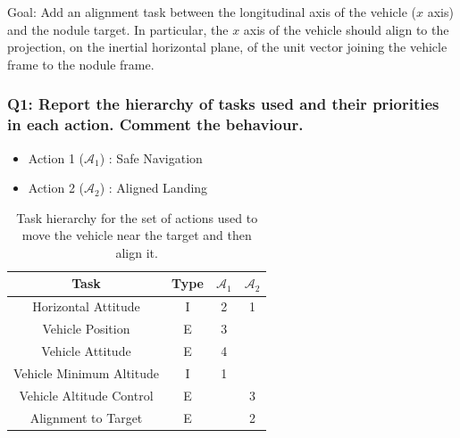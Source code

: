 \documentclass{article}
\begin{document}
Goal: Add an alignment task between the longitudinal axis of the vehicle ($x$ axis) and the nodule target. In particular, the $x$ axis of the vehicle should align to the projection, on the inertial horizontal plane, of the unit vector joining the vehicle frame to the nodule frame.

\subsubsection{Q1: Report the hierarchy of tasks used and their priorities in each action. Comment the behaviour.}

\begin{table}[htb]
	\caption{Task hierarchy for the set of actions used to move the vehicle near the target and then align it.}
	\begin{itemize}
		\item Action 1 ($\mathcal{A}_{1}$) : Safe Navigation
		\item Action 2 ($\mathcal{A}_{2}$) : Aligned Landing
	\end{itemize}
	\label{tb_align:actions_table}
	\begin{center}
		\footnotesize
		\begin{tabular}{cccc}
			\toprule
			Task & Type & $\mathcal{A}_{1}$ & $\mathcal{A}_{2}$ \\
			\midrule
			Horizontal Attitude             & I & 2 & 1 \\
			\hdashline
			Vehicle Position				& E & 3 &   \\
			\hdashline
			Vehicle Attitude                & E & 4 &   \\
			\hdashline
			Vehicle Minimum Altitude        & I & 1 &   \\
			\hdashline
			Vehicle Altitude Control        & E &   & 3 \\
			\hdashline
			Alignment to Target             & E &   & 2 \\
			
			\bottomrule
		\end{tabular}
	\end{center}
\end{table}%
\end{document}
